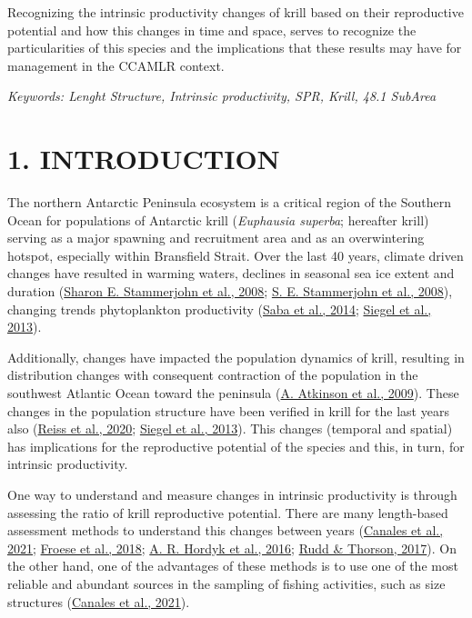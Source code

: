 \documentclass[
]{article}
\begin{document}
Recognizing the intrinsic productivity changes of krill based on their
reproductive potential and how this changes in time and space, serves to
recognize the particularities of this species and the implications that
these results may have for management in the CCAMLR context.

\emph{Keywords: Lenght Structure, Intrinsic productivity, SPR, Krill,
48.1 SubArea}

\newpage

\hypertarget{introduction}{%
\section{1. INTRODUCTION}\label{introduction}}

The northern Antarctic Peninsula ecosystem is a critical region of the
Southern Ocean for populations of Antarctic krill (\emph{Euphausia
superba}; hereafter krill) serving as a major spawning and recruitment
area and as an overwintering hotspot, especially within Bransfield
Strait. Over the last 40 years, climate driven changes have resulted in
warming waters, declines in seasonal sea ice extent and duration
(\protect\hyperlink{ref-Stammerjohn2008a}{Sharon E. Stammerjohn et al.,
2008}; \protect\hyperlink{ref-Stammerjohn2008}{S. E. Stammerjohn et al.,
2008}), changing trends phytoplankton productivity
(\protect\hyperlink{ref-Saba2014}{Saba et al., 2014};
\protect\hyperlink{ref-Siegel2013}{Siegel et al., 2013}).

Additionally, changes have impacted the population dynamics of krill,
resulting in distribution changes with consequent contraction of the
population in the southwest Atlantic Ocean toward the peninsula
(\protect\hyperlink{ref-Atkinson2009}{A. Atkinson et al., 2009}). These
changes in the population structure have been verified in krill for the
last years also (\protect\hyperlink{ref-Reiss2020}{Reiss et al., 2020};
\protect\hyperlink{ref-Siegel2013}{Siegel et al., 2013}). This changes
(temporal and spatial) has implications for the reproductive potential
of the species and this, in turn, for intrinsic productivity.

One way to understand and measure changes in intrinsic productivity is
through assessing the ratio of krill reproductive potential. There are
many length-based assessment methods to understand this changes between
years (\protect\hyperlink{ref-Canales2021}{Canales et al., 2021};
\protect\hyperlink{ref-Froese2018}{Froese et al., 2018};
\protect\hyperlink{ref-Hordyk2016}{A. R. Hordyk et al., 2016};
\protect\hyperlink{ref-Rudd2017a}{Rudd \& Thorson, 2017}). On the other
hand, one of the advantages of these methods is to use one of the most
reliable and abundant sources in the sampling of fishing activities,
such as size structures (\protect\hyperlink{ref-Canales2021}{Canales et
al., 2021}).
\end{document}

